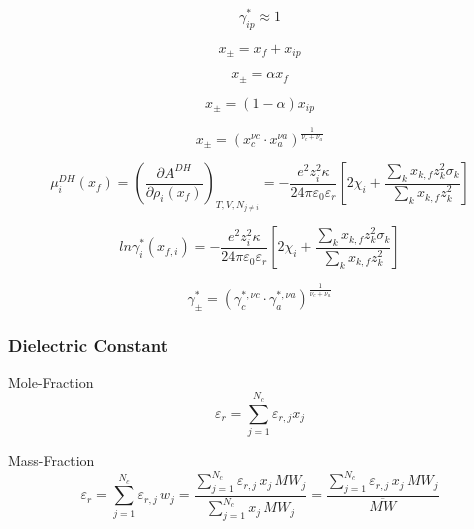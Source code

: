 \documentclass[12pt, letterpaper]{article}
\begin{document}
\begin{equation}
\gamma_{ip}^* \approx 1
\end{equation}

\begin{equation}
x_\pm = x_f + x_{ip}
\end{equation}

\begin{equation}
x_\pm = \alpha x_f
\end{equation}

\begin{equation}
x_\pm = (1 - \alpha) x_{ip}
\end{equation}

\begin{equation}
x_{\pm}=(x_{c}^{\nu c}\cdot x_{a}^{\nu a})^{\frac{1}{\nu_{c}+\nu_{a}}}
\end{equation}

\begin{equation}
\mu_{i}^{DH}\left(x_{f}\right)=\left(\frac{\partial A^{DH}}{\partial\rho_{i}\left(x_{f}\right)}\right)_{T,V,N_{j\neq i}}=-\frac{e^{2}z_{i}^{2}\kappa}{24\pi\varepsilon_{0}\varepsilon_{r}}\left[2\chi_{i}+\frac{\sum_{k}x_{k,f}z_{k}^{2}\sigma_{k}}{\sum_{k}x_{k,f}z_{k}^{2}}\right]
\end{equation}

\begin{equation}
ln\gamma_{i}^{*}\left(x_{f,i}\right)=-\frac{e^{2}z_{i}^{2}\kappa}{24\pi\varepsilon_{0}\varepsilon_{r}}\left[2\chi_{i}+\frac{\sum_{k}x_{k,f}z_{k}^{2}\sigma_{k}}{\sum_{k}x_{k,f}z_{k}^{2}}\right]
\end{equation}

\begin{equation}
\gamma_{\pm}^{*}=(\gamma_{c}^{*,\nu c}\cdot\gamma_{a}^{*,\nu a})^{\frac{1}{\nu_{c}+\nu_{a}}}
\end{equation}

\subsubsection{Dielectric Constant}

\cite{Ascani2021}


Mole-Fraction
\begin{equation}
\varepsilon_{r}=\sum_{j=1}^{N_c}\varepsilon_{r,j}x_j
\end{equation}

Mass-Fraction
\begin{equation}
\varepsilon_r=\sum_{j=1}^{N_c}\varepsilon_{r,j}\,w_j
=
\frac{\sum_{j=1}^{N_c}\varepsilon_{r,j}\,x_j\,MW_j}{\sum_{j=1}^{N_c}x_j\,MW_j}
=
\frac{\sum_{j=1}^{N_c}\varepsilon_{r,j}\,x_j\,MW_j}{\overline{MW}}
\end{equation}
\end{document}
